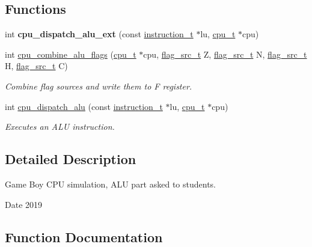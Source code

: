 \subsection*{Functions}
\begin{DoxyCompactItemize}
\item 
\mbox{\label{cpu-alu_8c_afe6c263f10df836653f53ef451182fe1}} 
int {\bfseries cpu\+\_\+dispatch\+\_\+alu\+\_\+ext} (const \hyperlink{structinstruction__t}{instruction\+\_\+t} $\ast$lu, \hyperlink{structcpu__t}{cpu\+\_\+t} $\ast$cpu)
\item 
int \hyperlink{cpu-alu_8c_ac780d6a4222a48f38ef077b29ca9dca2}{cpu\+\_\+combine\+\_\+alu\+\_\+flags} (\hyperlink{structcpu__t}{cpu\+\_\+t} $\ast$cpu, \hyperlink{cpu-alu_8h_a4c967c3e85658e567133a3f087ad8da9}{flag\+\_\+src\+\_\+t} Z, \hyperlink{cpu-alu_8h_a4c967c3e85658e567133a3f087ad8da9}{flag\+\_\+src\+\_\+t} N, \hyperlink{cpu-alu_8h_a4c967c3e85658e567133a3f087ad8da9}{flag\+\_\+src\+\_\+t} H, \hyperlink{cpu-alu_8h_a4c967c3e85658e567133a3f087ad8da9}{flag\+\_\+src\+\_\+t} C)
\begin{DoxyCompactList}\small\item\em Combine flag sources and write them to F register. \end{DoxyCompactList}\item 
int \hyperlink{cpu-alu_8c_ab160349665b976fd9744ef060ec11b34}{cpu\+\_\+dispatch\+\_\+alu} (const \hyperlink{structinstruction__t}{instruction\+\_\+t} $\ast$lu, \hyperlink{structcpu__t}{cpu\+\_\+t} $\ast$cpu)
\begin{DoxyCompactList}\small\item\em Executes an A\+LU instruction. \end{DoxyCompactList}\end{DoxyCompactItemize}


\subsection{Detailed Description}
Game Boy C\+PU simulation, A\+LU part asked to students. 

\begin{DoxyDate}{Date}
2019 
\end{DoxyDate}


\subsection{Function Documentation}
\mbox{\label{cpu-alu_8c_ac780d6a4222a48f38ef077b29ca9dca2}} 
